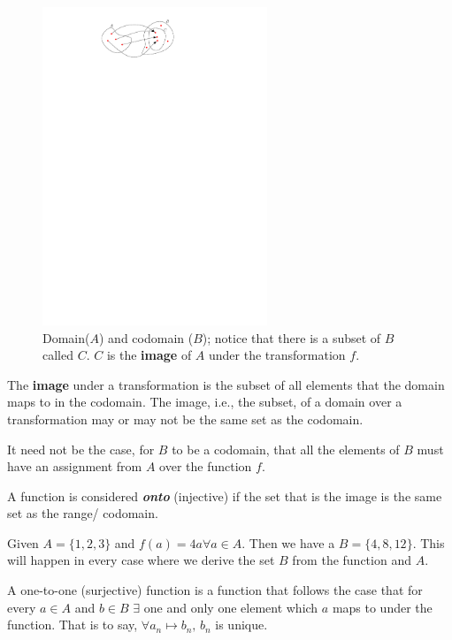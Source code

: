 \documentclass{article}
\begin{document}
  

\begin{figure}[ht]
    \centering
 \includegraphics[width=0.6\textwidth]{./figures/dandr.pdf}
 \caption{Domain($A$) and codomain ($B$); notice that there is a subset of $B$ called $C$. $C$ is the \textbf{image} of $A$ under the transformation $f$.}
    \label{fig:dandr}
\end{figure}
\pagebreak
\begin{definition}
  The \textbf{image} under a transformation is the subset of all elements that the domain maps to in the codomain. The image, i.e., the subset, of a domain over a transformation may or may not be the same set as the codomain.
\end{definition}

It need not be the case, for $B$ to be a codomain, that all the elements of $B$ must have an assignment from $A$ over the function $f$. 

\begin{definition}
  A function is considered \textbf{\textit{onto}} (injective) if the set that is the image is the same set as the range/ codomain. 
\end{definition}

Given $A=\{1,2,3\}$ and $f(a)=4a \forall a \in A$. Then we have a $B=\{4,8,12\}$. This will happen in every case where we derive the set $B$ from the function and $A$. 

\begin{definition}
  A one-to-one (surjective) function is a function that follows the case that for every $a\in A$ and $b\in B$ $\exists$ one and only one element which $a$ maps to under the function. That is to say, $\forall a_n \mapsto b_n, \, b_n$ is unique. 
\end{definition}
\end{document}
